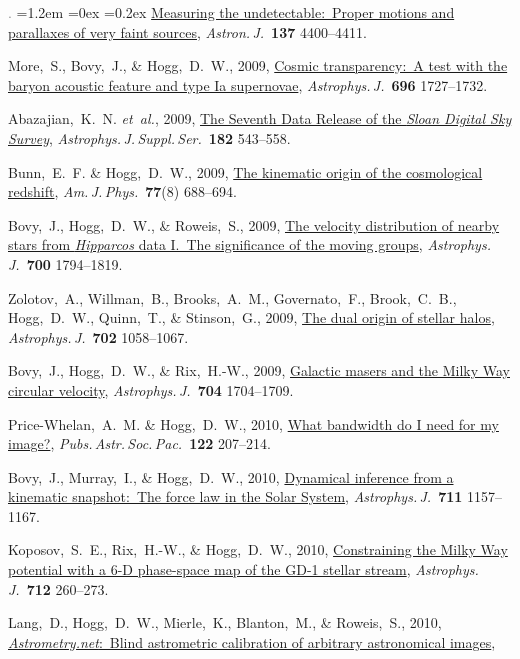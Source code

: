 \documentclass[10pt,letterpaper]{article}
\newcommand{\foreign}[1]{\textsl{#1}}
\newcommand{\etal}{\foreign{et~al.}}
\newcommand{\project}[1]{\textsl{#1}}
\newcommand{\doi}[2]{\href{http://dx.doi.org/#1}{{#2}}}
\newcommand{\deemph}[1]{\textcolor{grey}{\footnotesize{#1}}}
\newcommand{\pubnumber}[1]{\deemph{{#1}.}}
\newcounter{refpubnum}
\newcommand{\hogglist}{%
    \rightmargin=0in
    \leftmargin=1.2em
    \topsep=0ex
    \partopsep=0pt
    \itemsep=0.2ex
    \parsep=0pt
    \itemindent=-1.0\leftmargin
    \listparindent=0.0\leftmargin
    \settowidth{\labelsep}{~}
    \usecounter{refpubnum}
  }
\begin{document}
\begin{list}{\pubnumber{\therefpubnum}}{\hogglist}
\doi{10.1088/0004-6256/137/5/4400}{Measuring the undetectable:\ Proper motions and parallaxes of very faint sources},
\textit{Astron.\,J.}\ \textbf{137} 4400--4411.
\item
More,~S., Bovy,~J., \& Hogg,~D.~W., 2009,
\doi{10.1088/0004-637X/696/2/1727}{Cosmic transparency:\ A test with the baryon acoustic feature and type Ia supernovae},
\textit{Astrophys.\,J.}\ \textbf{696} 1727--1732.
\item
Abazajian,~K.~N. \etal, 2009,
\doi{10.1088/0067-0049/182/2/543}{The Seventh Data Release of the \project{Sloan Digital Sky Survey}},
\textit{Astrophys.\,J.\,Suppl.\,Ser.}\ \textbf{182} 543--558.
\item
Bunn,~E.~F. \& Hogg,~D.~W., 2009,
\doi{10.1119/1.3129103}{The kinematic origin of the cosmological redshift},
\textit{Am.\,J.\,Phys.}\ \textbf{77}(8) 688--694.
\item
Bovy,~J., Hogg,~D.~W., \& Roweis,~S., 2009,
\doi{10.1088/0004-637X/700/2/1794}{The velocity distribution of nearby stars from \project{Hipparcos} data I.~The significance of the moving groups},
\textit{Astrophys.\,J.}\ \textbf{700} 1794--1819.
\item
Zolotov,~A., Willman,~B., Brooks,~A.~M., Governato,~F., Brook,~C.~B., Hogg,~D.~W., Quinn,~T., \& Stinson,~G., 2009,
\doi{10.1088/0004-637X/702/2/1058}{The dual origin of stellar halos},
\textit{Astrophys.\,J.}\ \textbf{702} 1058--1067.
\item
Bovy,~J., Hogg,~D.~W., \& Rix,~H.-W., 2009,
\doi{10.1088/0004-637X/704/2/1704}{Galactic masers and the Milky Way circular velocity},
\textit{Astrophys.\,J.}\ \textbf{704} 1704--1709.
\item
Price-Whelan,~A.~M. \& Hogg,~D.~W., 2010,
\doi{10.1086/651009}{What bandwidth do I need for my image?},
\textit{Pubs.\,Astr.\,Soc.\,Pac.}\ \textbf{122} 207--214.
\item
Bovy,~J., Murray,~I., \& Hogg,~D.~W., 2010,
\doi{10.1088/0004-637X/711/2/1157}{Dynamical inference from a kinematic snapshot:\ The force law in the Solar System},
\textit{Astrophys.\,J.}\ \textbf{711} 1157--1167.
\item
Koposov,~S.~E., Rix,~H.-W., \& Hogg,~D.~W., 2010,
\doi{10.1088/0004-637X/712/1/260}{Constraining the Milky Way potential with a 6-D phase-space map of the GD-1 stellar stream},
\textit{Astrophys.\,J.}\ \textbf{712} 260--273.
\item
Lang,~D., Hogg,~D.~W., Mierle,~K., Blanton,~M., \& Roweis,~S., 2010,
\doi{10.1088/0004-6256/139/5/1782}{\project{Astrometry.net}:\ Blind astrometric calibration of arbitrary astronomical images},

\end{list}
\end{document}
